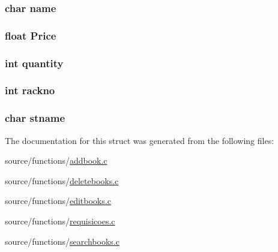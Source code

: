 \hypertarget{structbooks_a399913f362e281ef4dc15e393d33642b}{
\subsubsection[{name}]{\setlength{\rightskip}{0pt plus 5cm}char name}}\label{structbooks_a399913f362e281ef4dc15e393d33642b}
\hypertarget{structbooks_af97474bf51c3b45301f3e01271baef3b}{
\subsubsection[{Price}]{\setlength{\rightskip}{0pt plus 5cm}float Price}}\label{structbooks_af97474bf51c3b45301f3e01271baef3b}
\hypertarget{structbooks_ae6969e17e31c17a28dbf801f91acacfb}{
\subsubsection[{quantity}]{\setlength{\rightskip}{0pt plus 5cm}int quantity}}\label{structbooks_ae6969e17e31c17a28dbf801f91acacfb}
\hypertarget{structbooks_afea1bb3151c33a1c78ae6bd79f8fa754}{
\subsubsection[{rackno}]{\setlength{\rightskip}{0pt plus 5cm}int rackno}}\label{structbooks_afea1bb3151c33a1c78ae6bd79f8fa754}
\hypertarget{structbooks_adad902f541b3380ae89b050332193778}{
\subsubsection[{stname}]{\setlength{\rightskip}{0pt plus 5cm}char stname}}\label{structbooks_adad902f541b3380ae89b050332193778}


The documentation for this struct was generated from the following files\+:\begin{DoxyCompactItemize}
\item 
source/functions/\hyperlink{addbook_8c}{addbook.\+c}\item 
source/functions/\hyperlink{deletebooks_8c}{deletebooks.\+c}\item 
source/functions/\hyperlink{editbooks_8c}{editbooks.\+c}\item 
source/functions/\hyperlink{requisicoes_8c}{requisicoes.\+c}\item 
source/functions/\hyperlink{searchbooks_8c}{searchbooks.\+c}\end{DoxyCompactItemize}
